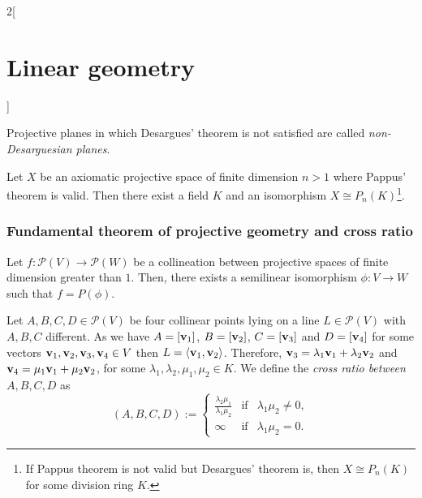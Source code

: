 \documentclass[../../../main.tex]{subfiles}
\begin{document}
\begin{multicols}{2}[\section{Linear geometry}]
\begin{definition}
\begin{itemize}
    \end{itemize}
  \end{definition}
  \begin{definition}
    Projective planes in which Desargues' theorem is not satisfied are called \textit{non-Desarguesian planes}.
  \end{definition}
  \begin{theorem}
    Let $X$ be an axiomatic projective space of finite dimension $n>1$ where Pappus' theorem is valid. Then there exist a field $K$ and an isomorphism $X\cong P_n(K)$\footnote{If Pappus theorem is not valid but Desargues' theorem is, then $X\cong P_n(K)$ for some division ring $K$.}.
  \end{theorem}
  \subsubsection{Fundamental theorem of projective geometry and cross ratio}
  \begin{theorem}
    Let $f:\mathcal{P}(V)\rightarrow \mathcal{P}(W)$ be a collineation between projective spaces of finite dimension greater than $1$. Then, there exists a semilinear isomorphism $\phi:V\rightarrow W$ such that $f=P(\phi)$.
  \end{theorem}
  \begin{definition}
    Let $A,B,C,D\in\mathcal{P}(V)$ be four collinear points lying on a line $L\in\mathcal{P}(V)$ with $A,B,C$ different. As we have $A=[\boldsymbol{\mathrm{v}}_1]$, $B=[\boldsymbol{\mathrm{v}}_2]$, $C=[\boldsymbol{\mathrm{v}}_3]$ and $D=[\boldsymbol{\mathrm{v}}_4]$ for some vectors $\boldsymbol{\mathrm{v}}_1,\boldsymbol{\mathrm{v}}_2,\boldsymbol{\mathrm{v}}_3,\boldsymbol{\mathrm{v}}_4\in V$ then $L=\langle \boldsymbol{\mathrm{v}}_1,\boldsymbol{\mathrm{v}}_2\rangle$. Therefore, $\boldsymbol{\mathrm{v}}_3=\lambda_1\boldsymbol{\mathrm{v}}_1+\lambda_2\boldsymbol{\mathrm{v}}_2$ and $\boldsymbol{\mathrm{v}}_4=\mu_1\boldsymbol{\mathrm{v}}_1+\mu_2\boldsymbol{\mathrm{v}}_2$, for some $\lambda_1,\lambda_2,\mu_1,\mu_2\in K$. We define the \textit{cross ratio between $A,B,C,D$} as $$(A,B,C,D):=\left\{
      \begin{array}{ccc}
        \displaystyle\frac{\lambda_2\mu_1}{\lambda_1\mu_2} & \text{if} & \lambda_1\mu_2\ne0, \\
        \infty                                             & \text{if} & \lambda_1\mu_2=0.
      \end{array}\right.$$
  \end{definition}

\end{multicols}
\end{document}
